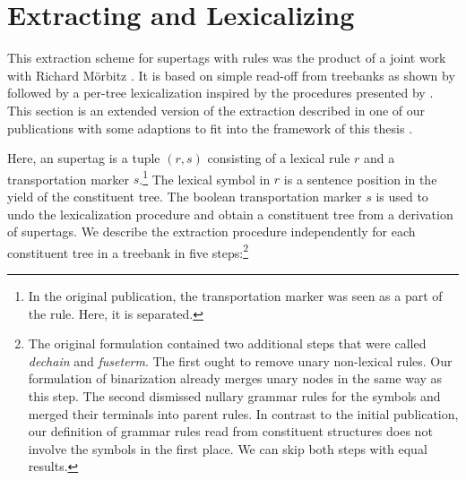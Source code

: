 \documentclass[../../document.tex]{subfiles}
\begin{document}
    \section{Extracting and Lexicalizing } \label{sec:extraction:lcfrs}
    This extraction scheme for supertags with  rules was the product of a joint work with Richard Mörbitz \citep{MoeRup20,RupMoe21}.
    It is based on simple  read-off from treebanks as shown by \citet{KalMai13} followed by a per-tree lexicalization inspired by the procedures presented by \citet{EngMalMan18}.
    This section is an extended version of the extraction described in one of our publications with some adaptions to fit into the framework of this thesis \citep{RupMoe21}.

    Here, an  supertag is a tuple \((r, s)\) consisting of a lexical rule \(r\) and a transportation marker \(s\).\footnote{
        In the original publication, the transportation marker was seen as a part of the  rule.
        Here, it is separated.
    }
    The lexical symbol in \(r\) is a sentence position in the yield of the constituent tree.
    The boolean transportation marker \(s\) is used to undo the lexicalization procedure and obtain a constituent tree from a derivation of supertags.
    We describe the extraction procedure independently for each constituent tree in a treebank in five steps:\footnote{\label{footnote:lcfrs:split}
        The original formulation contained two additional steps that were called \emph{dechain} and \emph{fuseterm}.
        The first ought to remove unary non-lexical rules.
        Our formulation of binarization already merges unary nodes in the same way as this step.
        The second dismissed nullary grammar rules for the  symbols and merged their terminals into parent rules.
        In contrast to the initial publication, our definition of grammar rules read from constituent structures does not involve the  symbols in the first place.
        We can skip both steps with equal results.
    }
\end{document}
